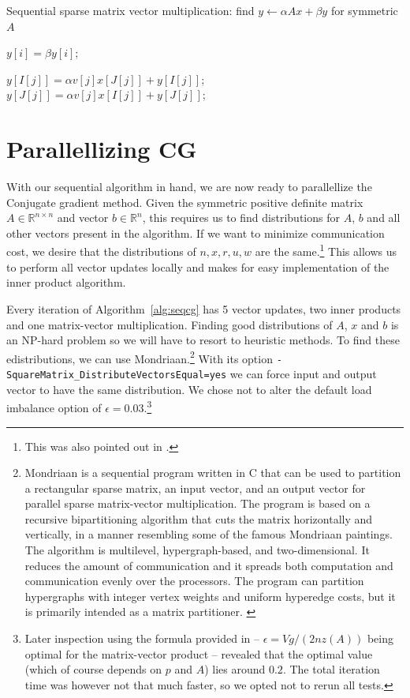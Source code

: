\documentclass[11pt]{amsart}
\theoremstyle{definition}
\newcommand{\R}{\mathbb{R}}
\newcommand{\N}{\mathbb{N}}
\begin{document}
\begin{algorithm}
\caption{Sequential sparse matrix vector multiplication: find $y \gets \alpha A x + \beta y$ for symmetric $A$}
\label{alg:sparsemv}
\begin{algorithmic}[1]
  \Require{$\alpha \in \R$, $\beta \in \R$, $n \in \N$, amount of nonzeroes $nz(A)$, $I \in \N^{nz(A)}$, $J \in \N^{nz(Z)}$, $v \in \R^{nz(A)}$, $x \in \R^n$, $y \in \R^n$}
    \State $y[i] = \beta y[i]$;
  \EndFor

    \State $y[I[j]] = \alpha v[j] x[J[j]] + y[I[j]]$;
     
      \State $y[J[j]] = \alpha v[j] x[I[j]] + y[J[j]]$;
    \EndIf
  \EndFor
\end{algorithmic}
\end{algorithm}


\section{Parallellizing CG}
With our sequential algorithm in hand, we are now ready to parallellize the Conjugate gradient method. Given the symmetric positive definite matrix $A \in \R^{n \times n}$ and vector $b \in \R^n$, this requires us to find distributions for $A$, $b$ and all other vectors present in the algorithm. If we want to minimize communication cost, we desire that the distributions of $n, x, r, u, w$ are the same.\footnote{This was also pointed out in \cite[p.~174]{biss04}.} This allows us to perform all vector updates locally and makes for easy implementation of the inner product algorithm.

Every iteration of Algorithm~\ref{alg:seqcg} has 5 vector updates, two inner products and one matrix-vector multiplication. Finding good distributions of $A$, $x$ and $b$ is an NP-hard problem so we will have to resort to heuristic methods. To find these edistributions, we can use Mondriaan.\footnote{Mondriaan is a sequential program written in C that can be used to partition a rectangular sparse matrix, an input vector, and an output vector for parallel sparse matrix-vector multiplication. The program is based on a recursive bipartitioning algorithm that cuts the matrix horizontally and vertically, in a manner resembling some of the famous Mondriaan paintings. The algorithm is multilevel, hypergraph-based, and two-dimensional. It reduces the amount of communication and it spreads both computation and communication evenly over the processors. The program can partition hypergraphs with integer vertex weights and uniform hyperedge costs, but it is primarily intended as a matrix partitioner. \cite{mondriaan}} With its option \texttt{-SquareMatrix\_DistributeVectorsEqual=yes} we can force input and output vector to have the same distribution. We chose not to alter the default load imbalance option of $\epsilon = 0.03$.\footnote{Later inspection using the formula provided in \cite[p.~189]{biss04} -- $\epsilon = Vg/(2nz(A))$ being optimal for the matrix-vector product -- revealed that the optimal value (which of course depends on $p$ and $A$) lies around $0.2$. The total iteration time was however not that much faster, so we opted not to rerun all tests.}
\end{document}
